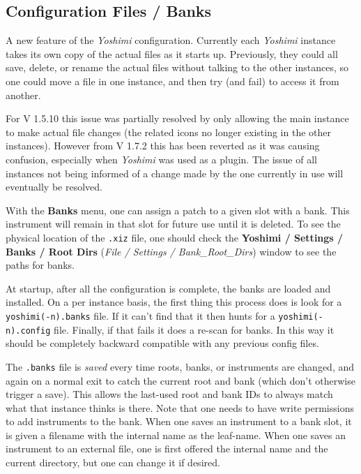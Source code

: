 \subsection{Configuration Files / Banks}
\label{subsec:configuration_banks}

   A new feature of the \textsl{Yoshimi} configuration.  Currently each
   \textsl{Yoshimi} instance takes its own copy of the actual files as it starts
   up.  Previously, they could all save, delete, or rename the actual files without
   talking to the other instances, so one could move a file in one instance, and
   then try (and fail) to access it from another.

   For V 1.5.10 this issue was partially resolved by only allowing the main instance
   to make actual file changes (the related icons no longer existing in the
   other instances). However from V 1.7.2 this has been reverted as it was causing
   confusion, especially when \textsl{Yoshimi} was used as a plugin. The issue of
   all instances not being informed of a change made by the one currently in use
   will eventually be resolved.

   With the \textbf{Banks} menu, one can assign a patch to a given slot with
   a bank.  This instrument will remain in that slot for future use until it is
   deleted. To see the physical location of the \texttt{.xiz} file, one
   should check the
   \textbf{Yoshimi / Settings / Banks / Root Dirs}
   (\textsl{File / Settings / Bank\_Root\_Dirs}) window to see the paths for
   banks.

   At startup, after all the configuration is complete, the banks are loaded and
   installed.  On a per instance basis, the first thing this process does is
   look for a \texttt{yoshimi(-n).banks} file. If it can't find that it then
   hunts for a \texttt{yoshimi(-n).config} file. Finally, if that fails it does a
   re-scan for banks. In this way it should be completely backward compatible
   with any previous config files.

   The \texttt{.banks} file is \textsl{saved} every time roots, banks, or
   instruments are changed, and again on a normal exit to catch the current
   root and bank (which don't otherwise trigger a save).  This allows the
   last-used root and bank IDs to always match what that instance thinks is
   there.  Note that one needs to have write permissions to add instruments to
   the bank.  When one saves an instrument to a bank slot, it is given a
   filename with the internal name as the leaf-name.  When one saves an
   instrument to an external file, one is  first offered the internal name
   and the current directory, but one can change it if desired.

